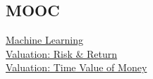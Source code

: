 \documentclass[]{deedy}
\begin{document}
\begin{minipage}[t]{0.25\textwidth}
\begin{flushleft}
\subsection{MOOC}
\href{https://www.coursera.org/account/accomplishments/certificate/7V2KZSKAL7ZJ}{Machine Learning} \\
\vspace{1pt}
\href{https://www.coursera.org/account/accomplishments/certificate/98ZD8GFQ8BMS}{Valuation: Risk \& Return} \\
\vspace{1pt}
\href{https://www.coursera.org/account/accomplishments/certificate/P637RR9C8B7T}{Valuation: Time Value of Money} \\
%
\end{flushleft}
\end{minipage}
\hfill
%
\end{document}
